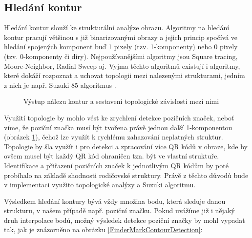 \subsection{Hledání kontur}
\label{hledaniKontur}

Hledání kontur slouží ke strukturální analýze obrazu. Algoritmy na hledání
kontur pracují většinou s již binarizovanými obrazy a jejich princip spočívá ve
hledání spojených komponent buď 1 pixely (tzv. 1-komponenty) nebo 0 pixely 
(tzv. 0-komponenty či díry). Nejpoužívanějšími algoritmy jsou Square tracing,
Moore-Neighbor, Radial Sweep aj. Vyjma těchto algoritmů existují i algoritmy,
které dokáží rozpoznat a uchovat topologii mezi nalezenými strukturami, jedním
z nich je např. Suzuki 85 algoritmus \cite{suzukiLit}.

\begin{figure}[H]
  \begin{center}
    \caption{Výstup nálezu kontur a sestavení topologické závislosti mezi nimi}
    \label{ContourTopology}
  \end{center}
\end{figure}

Využití topologie by mohlo vést ke zrychlení detekce pozičních značek, neboť
víme, že poziční značka musí být tvořena právě jednou další 1-komponentou
(obrázek \ref{ContourTopology}), čehož lze využít k rychlému zahazování
neplatných struktur. Topologie by šla využít i pro detekci a zpracování více QR
kódů v obraze, kde by ovšem musel být každý QR kód ohraničen tzn. být ve vlastní struktuře. Identifikace a přiřazení
pozičních značek k jednotlivým QR kódům by poté probíhalo na základě shodnosti
rodičovské struktury. Právě z těchto důvodů bude v implementaci využito
topologické analýzy a Suzuki algoritmu.

Výsledkem hledání kontury bývá vždy množina bodu, která sleduje danou strukturu,
v našem případě např. poziční značku. Pokud uvážíme již i nějaký druh
interpolace bodů, možný výsledek detekce poziční značky by mohl vypadat tak,
jak je znázorněno na obrázku \ref{FinderMarkContourDetection}:

